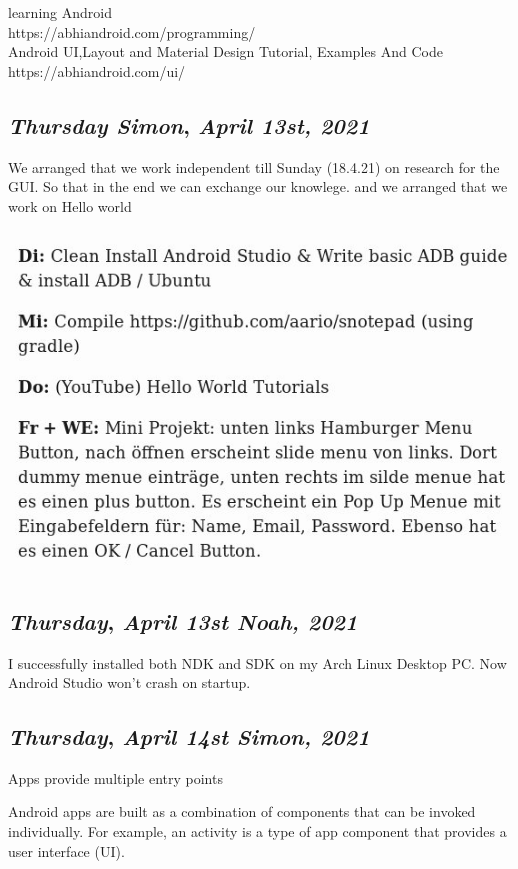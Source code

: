 learning Android \\
https://abhiandroid.com/programming/ \\

Android UI,Layout and Material Design Tutorial, Examples And Code\\
https://abhiandroid.com/ui/



\def\day{\textit{April 13st, 2021}}
\def\weekday{\textit{Thursday Simon}}
\subsection*{\weekday, \day}
We arranged that we work independent till Sunday (18.4.21) on research for the GUI. So that in the end we can exchange our knowlege. 
and we arranged that we work on Hello world 

\includegraphics[width=.8\textwidth]{media/WochenPlan13.4.jpeg}


\def\day{\textit{April 13st Noah, 2021}}
\def\weekday{\textit{Thursday}}
\subsection*{\weekday, \day}

I successfully installed both NDK and SDK on my Arch Linux Desktop PC. Now Android Studio won't crash on startup.


\def\day{\textit{April 14st Simon, 2021}}
\def\weekday{\textit{Thursday}}
\subsection*{\weekday, \day}
Apps provide multiple entry points

Android apps are built as a combination of components that can be invoked individually. For example, an activity is a type of app component that provides a user interface (UI).

